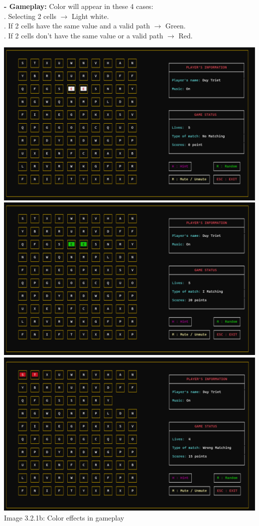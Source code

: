 \documentclass[12pt,a4paper]{report}
\begin{document}
\newpage
\hspace{-0.6cm}\textbf{- Gameplay:} Color will appear in these 4 cases:\\[0.2cm]
. Selecting 2 cells $\rightarrow$ Light white.\\
. If 2 cells have the same value and a valid path $\rightarrow$ Green.\\
. If 2 cells don’t have the same value or a valid path $\rightarrow$ Red.\\
\begin{center}
    \includegraphics[scale=0.3]{Select.png}\\[0.2cm]
    \includegraphics[scale=0.3]{Valid.png}\\[0.2cm]
    \includegraphics[scale=0.3]{Invalid.png}\\[0.2cm]
    Image 3.2.1b: Color effects in gameplay
\end{center}
\newpage
\end{document}
